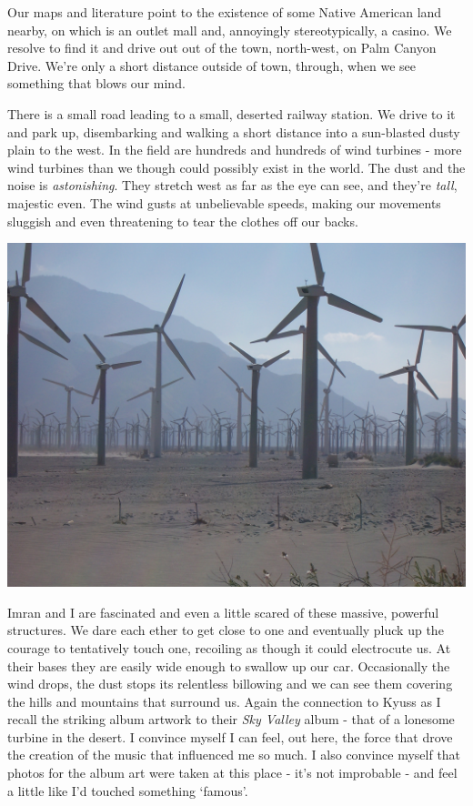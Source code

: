 \documentclass[a5paper,titlepage,11pt,draft]{book}
\begin{document}
Our maps and literature point to the existence of some Native American land nearby, on which is an outlet mall and, annoyingly stereotypically, a casino.  We resolve to find it and drive out out of the town, north-west, on Palm Canyon Drive. We're only a short distance outside of town, through, when we see something that blows our mind.

There is a small road leading to a small, deserted railway station.  We drive to it and park up, disembarking and walking a short distance into a sun-blasted dusty plain to the west.  In the field are hundreds and hundreds of wind turbines - more wind turbines than we though could possibly exist in the world.  The dust and the noise is \emph{astonishing}.  They stretch west as far as the eye can see, and they're \emph{tall}, majestic even.  The wind gusts at unbelievable speeds, making our movements sluggish and even threatening to tear the clothes off our backs.

\begin{center}\includegraphics[width=\textwidth]{gfx/100_1636}\end{center}

Imran and I are fascinated and even a little scared of these massive, powerful structures.  We dare each ether to get close to one and eventually pluck up the courage to tentatively touch one, recoiling as though it could electrocute us.  At their bases they are easily wide enough to swallow up our car.  Occasionally the wind drops, the dust stops its relentless billowing and we can see them covering the hills and mountains that surround us.  Again the connection to Kyuss as I recall the striking album artwork to their \emph{Sky Valley} album - that of a lonesome turbine in the desert.  I convince myself I can feel, out here, the force that drove the creation of the music that influenced me so much.  I also convince myself that photos for the album art were taken at this place - it's not improbable - and feel a little like I'd touched something `famous'.
\end{document}
